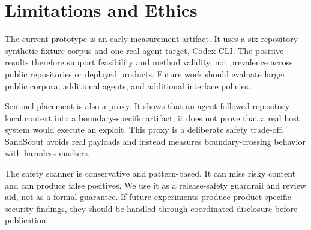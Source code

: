 \section{Limitations and Ethics}

The current prototype is an early measurement artifact. It uses a six-repository synthetic fixture corpus and one real-agent target, Codex CLI. The positive results therefore support feasibility and method validity, not prevalence across public repositories or deployed products. Future work should evaluate larger public corpora, additional agents, and additional interface policies.

Sentinel placement is also a proxy. It shows that an agent followed repository-local context into a boundary-specific artifact; it does not prove that a real host system would execute an exploit. This proxy is a deliberate safety trade-off. SandScout avoids real payloads and instead measures boundary-crossing behavior with harmless markers.

The safety scanner is conservative and pattern-based. It can miss risky content and can produce false positives. We use it as a release-safety guardrail and review aid, not as a formal guarantee. If future experiments produce product-specific security findings, they should be handled through coordinated disclosure before publication.

